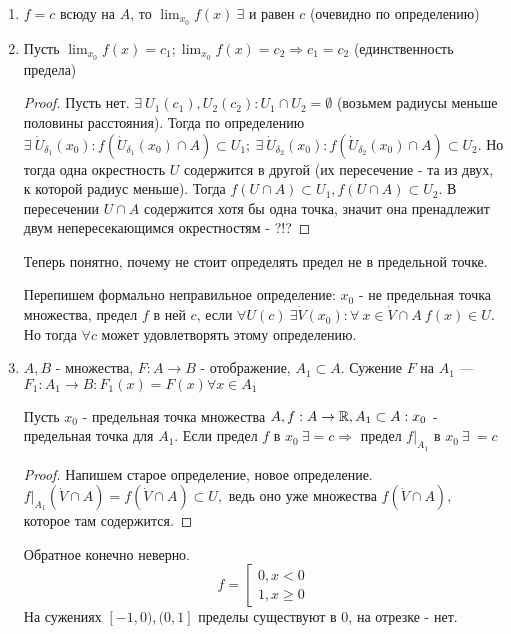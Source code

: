 \documentclass[12pt]{report}
\begin{document}
\begin{prop}
\begin{enumerate}
\item $f = c$ всюду на $A$, то $\lim_{x_0}{f(x)} ~\exists$ и равен $c$ (очевидно по определению)
\item Пусть $\lim_{x_0}{f(x)} = c_1; \lim_{x_0}{f(x)} = c_2 \Rightarrow c_1 = c_2$ (единственность предела)
\begin{proof}
Пусть нет. $\exists ~U_1(c_1), U_2(c_2): U_1 \cap U_2 = \emptyset$ (возьмем радиусы меньше половины расстояния). Тогда по определению $\exists ~\dot U_{\delta_1}(x_0): f(\dot U_{\delta_1}(x_0) \cap A) \subset U_1; ~\exists ~\dot U_{\delta_2}(x_0): f(\dot U_{\delta_2}(x_0) \cap A) \subset U_2$. Но тогда одна окрестность $U$ содержится в другой (их пересечение - та из двух, к которой радиус меньше). Тогда $f(U \cap A) \subset U_1, f(U \cap A) \subset U_2$. В пересечении $U \cap A$ содержится хотя бы одна точка, значит она пренадлежит двум непересекающимся окрестностям - ?!?
\end{proof}

\begin{note}
Теперь понятно, почему не стоит определять предел не в предельной точке.

Перепишем формально неправильное определение: $x_0$ - не предельная точка множества, предел $f$ в ней $c$, если $\forall U(c) ~\exists \dot V(x_0): \forall ~x \in \dot V \cap A ~f(x) \in U$. Но тогда $\forall c$ может удовлетворять этому определению.
\end{note}

\item
\begin{defn}
$A, B$ - множества, $F: A \to B$ - отображение, $A_1 \subset A$. Сужение $F$ на $A_1$ --- $F_1: A_1 \to B: F_1(x) = F(x) \forall x \in A_1$
\end{defn}

\begin{st}
Пусть $x_0$ - предельная точка множества $A, f: A \to \mathbb{R}, A_1 \subset A: x_0$ - предельная точка для $A_1$. Если предел $f$ в $x_0 ~\exists = c \Rightarrow$ предел $f|_{A_1}$ в $x_0 ~\exists ~= c$
\end{st}
\begin{proof}
Напишем старое определение, новое определение. $f|_{A_1}(\dot V \cap A) = f(\dot V \cap A) \subset U,$ ведь оно уже множества $f(\dot V \cap A),$ которое там содержится.
\end{proof}

\begin{rem}
Обратное конечно неверно. 
$$f = 
\left[
\begin{matrix}
0, x < 0\\
1, x \ge 0
\end{matrix}\right.
$$
На сужениях $[-1, 0), (0, 1]$ пределы существуют в $0$, на отрезке - нет.
\end{rem}


\end{enumerate}
\end{prop}
\end{document}
